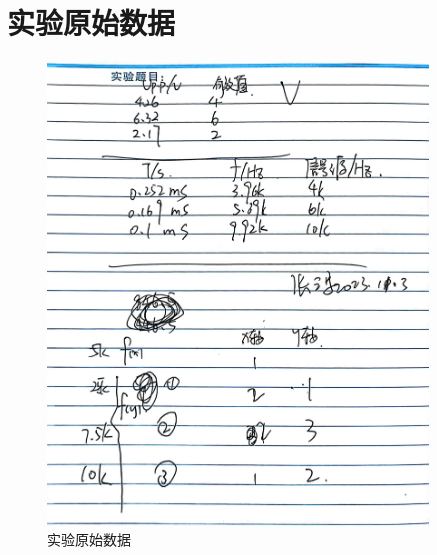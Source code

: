 \documentclass{ctexart}
\begin{document}
\section{实验原始数据}
\begin{figure}[H]
  \centering
  \includegraphics[width=0.9\textwidth,height=0.8\textheight]{shiyanshujv.jpg}
  \caption{实验原始数据}
\end{figure}
\newpage
\end{document}
